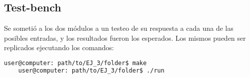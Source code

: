 \subsection{Test-bench}
Se sometió a los dos módulos a un testeo de su respuesta a cada una de las posibles entradas, y los resultados fueron los esperados.
Los mismos pueden ser replicados ejecutando los comandos:
\begin{lstlisting}[language=bash]
    user@computer: path/to/EJ_3/folder$ make
    user@computer: path/to/EJ_3/folder$ ./run
\end{lstlisting}